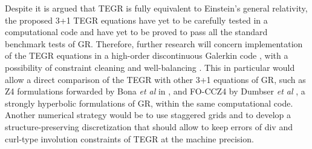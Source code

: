 \documentclass[
10pt, %
a4paper, %
oneside, %
twocolumn,
headinclude,footinclude, %
BCOR5mm, %
]{scrartcl}
\begin{document}
	
	Despite it is argued that TEGR is fully equivalent to Einstein's general
	relativity, the proposed 3+1 TEGR equations have yet to be carefully tested
	in a computational code and have yet to be proved to pass all the standard
	benchmark tests of GR. Therefore, further research will concern
	implementation of the TEGR equations in a high-order discontinuous Galerkin
	code \cite{Dumbser2018a,Busto2020}, with a possibility of constraint
	cleaning  \cite{Dumbser2019} and well-balancing \cite{Gaburro2021}. This in
	particular would allow a direct comparison of the TEGR with other 	3+1
	equations of GR, such as Z4 formulations \cite{Alic2012} forwarded by Bona
	\textit{et al} in \cite{Z4}, and FO-CCZ4 by Dumbser \textit{et al}
	\cite{FO-CCZ4}, a strongly hyperbolic formulations of GR, within the same
	computational code.  Another numerical strategy would be to use staggered
	grids and to develop a structure-preserving discretization
	\cite{SIGPR2021,Olivares2022,Fambri2020a,oliynyk2025} that should allow to keep errors
	of div and curl-type involution constraints of TEGR at the machine
	precision.
	
	
\end{document}
